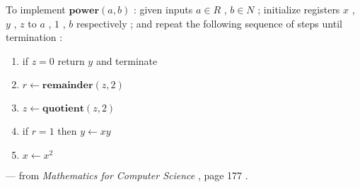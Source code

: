 \documentclass{article}
\begin{document}
To implement $ \mathbf{power}(a,b) $ :
given inputs $ a \in R $ , $ b \in N $ ;
initialize registers $ x $ , $ y $ , $ z $ to
$ a $ , $ 1 $ , $ b $ respectively ; and
repeat the following sequence of steps until termination :

\begin{enumerate}
\item if $ z = 0 $ return $ y $ and terminate
\item $ r \leftarrow \mathbf{remainder}(z,2) $
\item $ z \leftarrow \mathbf{quotient}(z,2) $
\item if $ r = 1 $ then $ y \leftarrow xy $
\item $ x \leftarrow x^2 $
\end{enumerate}

--- from \textit{Mathematics for Computer Science} , page 177 .
\end{document}

